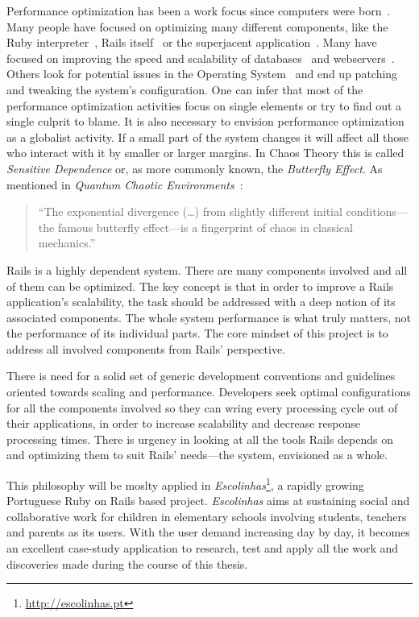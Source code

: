 Performance optimization has been a work focus since computers were born~\cite{mass_memory_system_optimization}. Many people have focused on optimizing many different components, like the Ruby interpreter~\cite{yarv}, Rails itself~\cite{rails_merb_merge_performance} or the superjacent application~\cite{scaling_rails_bottomup,vaporware_to_awesome,rebuilding_scaling_yellowpages,5tips_scale_ror}. Many have focused on improving the speed and scalability of databases~\cite{performance_analysis_db_arch} and webservers~\cite{webserver_scheduling}. Others look for potential issues in the Operating System~\cite{unix_os_comparison, architecture_impact_os} and end up patching and tweaking the system's configuration. One can infer that most of the performance optimization activities focus on single elements or try to find out a single culprit to blame. It is also necessary to envision performance optimization as a globalist activity. If a small part of the system changes it will affect all those who interact with it by smaller or larger margins. In Chaos Theory this is called \textit{Sensitive Dependence} or, as more commonly known, the \textit{Butterfly Effect}. As mentioned in \textit{Quantum Chaotic Environments}~\cite{butterfly_effect_quote}:
\begin{quote}
  ``The exponential divergence (\ldots) from slightly different initial conditions---the famous butterfly effect---is a fingerprint of chaos in classical mechanics.''
\end{quote}
Rails is a highly dependent system. There are many components involved and all of them can be optimized. The key concept is that in order to improve a Rails application's scalability, the task should be addressed with a deep notion of its associated components. The whole system performance is what truly matters, not the performance of its individual parts. The core mindset of this project is to address all involved components from Rails' perspective.

There is need for a solid set of generic development conventions and guidelines oriented towards scaling and performance. Developers seek optimal configurations for all the components involved so they can wring every processing cycle out of their applications, in order to increase scalability and decrease response processing times. There is urgency in looking at all the tools Rails depends on and optimizing them to suit Rails' needs---the system, envisioned as a whole.

This philosophy will be moslty applied in \textit{Escolinhas}\footnote{\url{http://escolinhas.pt}}, a rapidly growing Portuguese Ruby on Rails based project. \textit{Escolinhas} aims at sustaining social and collaborative work for children in elementary schools involving students, teachers and parents as its users. With the user demand increasing day by day, it becomes an excellent case-study application to research, test and apply all the work and discoveries made during the course of this thesis.

